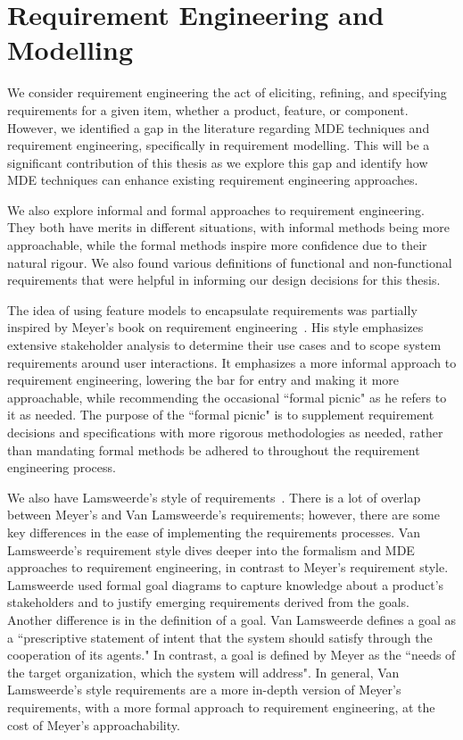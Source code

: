 \section{Requirement Engineering and Modelling}

We consider requirement engineering the act of eliciting, refining, and specifying requirements for a given item, whether a product, feature, or component. However, we identified a gap in the literature regarding \gls{MDE} techniques and requirement engineering, specifically in requirement modelling. This will be a significant contribution of this thesis as we explore this gap and identify how \gls{MDE} techniques can enhance existing requirement engineering approaches.

We also explore informal and formal approaches to requirement engineering. They both have merits in different situations, with informal methods being more approachable, while the formal methods inspire more confidence due to their natural rigour. We also found various definitions of functional and non-functional requirements that were helpful in informing our design decisions for this thesis.


The idea of using feature models to encapsulate requirements was partially inspired by Meyer's book on requirement engineering~\cite {meyer2022handbook}. His style emphasizes extensive stakeholder analysis to determine their use cases and to scope system requirements around user interactions. It emphasizes a more informal approach to requirement engineering, lowering the bar for entry and making it more approachable, while recommending the occasional ``formal picnic" as he refers to it as needed. The purpose of the ``formal picnic" is to supplement requirement decisions and specifications with more rigorous methodologies as needed, rather than mandating formal methods be adhered to throughout the requirement engineering process.

We also have Lamsweerde's style of requirements~\cite{lamsweerde2009requirements}. There is a lot of overlap between Meyer's and Van Lamsweerde's requirements; however, there are some key differences in the ease of implementing the requirements processes. Van Lamsweerde's requirement style dives deeper into the formalism and MDE approaches to requirement engineering, in contrast to Meyer's requirement style. Lamsweerde used formal goal diagrams to capture knowledge about a product's stakeholders and to justify emerging requirements derived from the goals. Another difference is in the definition of a goal. Van Lamsweerde defines a goal as a ``prescriptive statement of intent that the system should satisfy through the cooperation of its agents." In contrast, a goal is defined by Meyer as the ``needs of the target organization, which the system will address". In general, Van Lamsweerde's style requirements are a more in-depth version of Meyer's requirements, with a more formal approach to requirement engineering, at the cost of Meyer's approachability.

